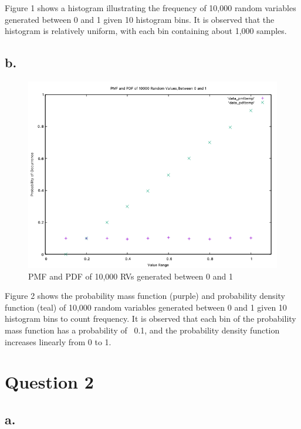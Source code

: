 \documentclass{report}
\begin{document}
	Figure 1 shows a histogram illustrating the frequency of 10,000 random variables generated between 0 and 1 given 10 histogram bins. It is observed that the histogram is relatively uniform, with each bin containing about 1,000 samples.
	
	\newpage
	
	\subsection*{b.}
	
	\begin{figure}[!ht]
		\centering
		\includegraphics[scale=0.7]{figures/q1b_results.png}
		\caption{PMF and PDF of 10,000 RVs generated between 0 and 1}
	\end{figure}

	Figure 2 shows the probability mass function (purple) and probability density function (teal) of 10,000 random variables generated between 0 and 1 given 10 histogram bins to count frequency. It is observed that each bin of the probability mass function has a probability of ~0.1, and the probability density function increases linearly from 0 to 1.
	
	\newpage
	
	\section*{Question 2}
	
	\subsection*{a.}
	
\end{document}
